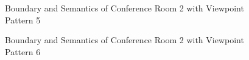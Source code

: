 \documentclass[11pt, a4paper,oneside,chapterprefix=false]{scrbook}
\begin{document}
\begin{figure}[H]
    \centering
      \label{fig:conf2 b 5} \hfill
     \label{fig:conf2 s 5}
    \caption{Boundary and Semantics of Conference Room 2 with Viewpoint Pattern 5}
    \label{fig:conf2 5}
\end{figure}

\begin{figure}[H]
    \centering
      \label{fig:conf2 b 6} \hfill
     \label{fig:conf2 s 6}
    \caption{Boundary and Semantics of Conference Room 2 with Viewpoint Pattern 6}
    \label{fig:conf2 6}
\end{figure}
\end{document}
